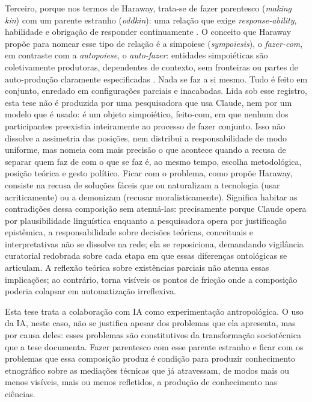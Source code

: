 Terceiro, porque nos termos de Haraway, trata-se de fazer parentesco (\textit{making kin}) com um parente estranho (\textit{oddkin}): uma relação que exige \textit{response-ability}, habilidade e obrigação de responder continuamente \parencite{Haraway2016Staying}. O conceito que Haraway propõe para nomear esse tipo de relação é a simpoiese (\textit{sympoiesis}), o \textit{fazer-com}, em contraste com a \textit{autopoiese}, o \textit{auto-fazer}: entidades simpoiéticas são coletivamente produtoras, dependentes de contexto, sem fronteiras ou partes de auto-produção claramente especificadas \parencite{Haraway2016Staying}. Nada se faz a si mesmo. Tudo é feito em conjunto, enredado em configurações parciais e inacabadas. Lida sob esse registro, esta tese não é produzida por uma pesquisadora que usa Claude, nem por um modelo que é usado: é um objeto simpoiético, feito-com, em que nenhum dos participantes preexistia inteiramente ao processo de fazer conjunto. Isso não dissolve a assimetria das posições, nem distribui a responsabilidade de modo uniforme, mas nomeia com mais precisão o que acontece quando a recusa de separar quem faz de com o que se faz é, ao mesmo tempo, escolha metodológica, posição teórica e gesto político. Ficar com o problema, como propõe Haraway, consiste na recusa de soluções fáceis que ou naturalizam a tecnologia (usar acriticamente) ou a demonizam (recusar moralisticamente). Significa habitar as contradições dessa composição sem atenuá-las: precisamente porque Claude opera por plausibilidade linguística enquanto a pesquisadora opera por justificação epistêmica, a responsabilidade sobre decisões teóricas, conceituais e interpretativas não se dissolve na rede; ela se reposiciona, demandando vigilância curatorial redobrada sobre cada etapa em que essas diferenças ontológicas se articulam. A reflexão teórica sobre existências parciais não atenua essas implicações; ao contrário, torna visíveis os pontos de fricção onde a composição poderia colapsar em automatização irreflexiva.

Esta tese trata a colaboração com IA como experimentação antropológica. O uso da IA, neste caso, não se justifica apesar dos problemas que ela apresenta, mas por causa deles: esses problemas são constitutivos da transformação sociotécnica que a tese documenta. Fazer parentesco com esse parente estranho e ficar com os problemas que essa composição produz é condição para produzir conhecimento etnográfico sobre as mediações técnicas que já atravessam, de modos mais ou menos visíveis, mais ou menos refletidos, a produção de conhecimento nas ciências.


